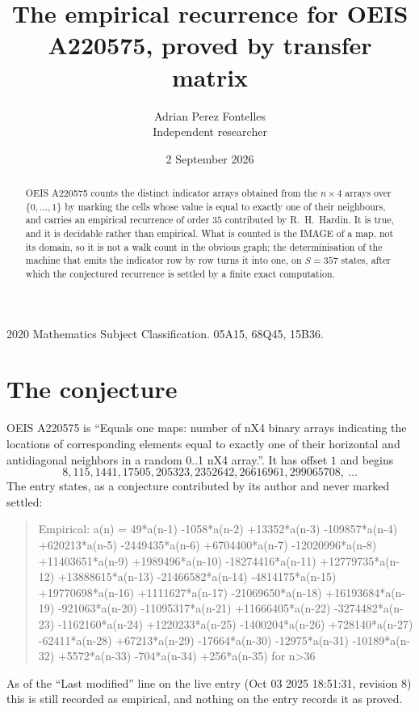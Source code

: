 \documentclass[11pt,a4paper]{article}
\title{The empirical recurrence for OEIS A220575, proved by transfer matrix}
\author{Adrian Perez Fontelles\\ \small Independent researcher}
\date{2 September 2026}
\theoremstyle{plain}
\theoremstyle{definition}
\begin{document}
\maketitle

\begin{abstract}
OEIS A220575 counts the distinct indicator arrays obtained from the $n\times4$ arrays over
$\{0,\dots,1\}$ by marking the cells whose value is equal to exactly one of their neighbours, and carries an
empirical recurrence of order $35$ contributed by R.~H.~Hardin. It is true, and it is
decidable rather than empirical. What is counted is the IMAGE of a map, not its domain, so it
is not a walk count in the obvious graph; the determinisation of the machine that emits the
indicator row by row turns it into one, on $S=357$ states, after which the conjectured
recurrence is settled by a finite exact computation.
\end{abstract}

\noindent\small 2020 Mathematics Subject Classification. 05A15, 68Q45, 15B36.\normalsize

\section{The conjecture}

OEIS A220575 is ``Equals one maps: number of nX4 binary arrays indicating the locations of corresponding elements equal to exactly one of their horizontal and antidiagonal neighbors in a random 0..1 nX4 array.''. It has offset $1$ and begins
\[
8, 115, 1441, 17505, 205323, 2352642, 26616961, 299065708,\ \dots
\]
The entry states, as a conjecture contributed by its author and never marked settled:
\begin{quote}
Empirical: a(n) = 49*a(n-1) -1058*a(n-2) +13352*a(n-3) -109857*a(n-4) +620213*a(n-5) -2449435*a(n-6) +6704400*a(n-7) -12020996*a(n-8) +11403651*a(n-9) +1989496*a(n-10) -18274416*a(n-11) +12779735*a(n-12) +13888615*a(n-13) -21466582*a(n-14) -4814175*a(n-15) +19770698*a(n-16) +1111627*a(n-17) -21069650*a(n-18) +16193684*a(n-19) -921063*a(n-20) -11095317*a(n-21) +11666405*a(n-22) -3274482*a(n-23) -1162160*a(n-24) +1220233*a(n-25) -1400204*a(n-26) +728140*a(n-27) -62411*a(n-28) +67213*a(n-29) -17664*a(n-30) -12975*a(n-31) -10189*a(n-32) +5572*a(n-33) -704*a(n-34) +256*a(n-35) for n>36
\end{quote}
As of the ``Last modified'' line on the live entry (Oct 03 2025 18:51:31, revision 8) this is still
recorded as empirical, and nothing on the entry records it as proved.
\end{document}
